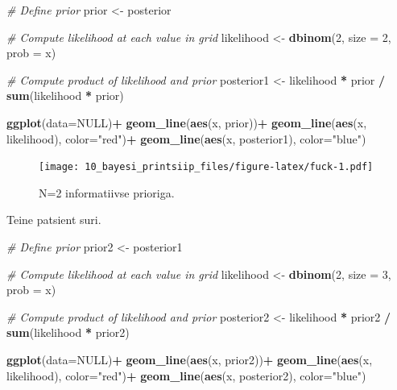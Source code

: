 \documentclass[]{book}
\newenvironment{Shaded}{\begin{snugshade}}{\end{snugshade}}
\newcommand{\CommentTok}[1]{\textcolor[rgb]{0.56,0.35,0.01}{\textit{#1}}}
\newcommand{\DataTypeTok}[1]{\textcolor[rgb]{0.13,0.29,0.53}{#1}}
\newcommand{\DecValTok}[1]{\textcolor[rgb]{0.00,0.00,0.81}{#1}}
\newcommand{\KeywordTok}[1]{\textcolor[rgb]{0.13,0.29,0.53}{\textbf{#1}}}
\newcommand{\NormalTok}[1]{#1}
\newcommand{\OperatorTok}[1]{\textcolor[rgb]{0.81,0.36,0.00}{\textbf{#1}}}
\newcommand{\OtherTok}[1]{\textcolor[rgb]{0.56,0.35,0.01}{#1}}
\newcommand{\StringTok}[1]{\textcolor[rgb]{0.31,0.60,0.02}{#1}}
\begin{document}
\begin{Shaded}
\begin{Highlighting}[]
\CommentTok{# Define prior}
\NormalTok{prior <-}\StringTok{ }\NormalTok{posterior}

\CommentTok{# Compute likelihood at each value in grid}
\NormalTok{likelihood <-}\StringTok{ }\KeywordTok{dbinom}\NormalTok{(}\DecValTok{2}\NormalTok{, }\DataTypeTok{size =} \DecValTok{2}\NormalTok{, }\DataTypeTok{prob =}\NormalTok{ x)}

\CommentTok{# Compute product of likelihood and prior}
\NormalTok{posterior1 <-}\StringTok{ }\NormalTok{likelihood }\OperatorTok{*}\StringTok{ }\NormalTok{prior }\OperatorTok{/}\StringTok{ }\KeywordTok{sum}\NormalTok{(likelihood }\OperatorTok{*}\StringTok{ }\NormalTok{prior)}

\KeywordTok{ggplot}\NormalTok{(}\DataTypeTok{data=}\OtherTok{NULL}\NormalTok{)}\OperatorTok{+}
\StringTok{  }\KeywordTok{geom_line}\NormalTok{(}\KeywordTok{aes}\NormalTok{(x, prior))}\OperatorTok{+}
\StringTok{  }\KeywordTok{geom_line}\NormalTok{(}\KeywordTok{aes}\NormalTok{(x, likelihood), }\DataTypeTok{color=}\StringTok{"red"}\NormalTok{)}\OperatorTok{+}
\StringTok{  }\KeywordTok{geom_line}\NormalTok{(}\KeywordTok{aes}\NormalTok{(x, posterior1), }\DataTypeTok{color=}\StringTok{"blue"}\NormalTok{)}
\end{Highlighting}
\end{Shaded}

\begin{figure}
\centering
\texttt{[image: 10\_bayesi\_printsiip\_files/figure-latex/fuck-1.pdf]}
\caption{\label{fig:fuck}N=2 informatiivse prioriga.}
\end{figure}

Teine patsient suri.



\begin{Shaded}
\begin{Highlighting}[]
\CommentTok{# Define prior}
\NormalTok{prior2 <-}\StringTok{ }\NormalTok{posterior1}

\CommentTok{# Compute likelihood at each value in grid}
\NormalTok{likelihood <-}\StringTok{ }\KeywordTok{dbinom}\NormalTok{(}\DecValTok{2}\NormalTok{, }\DataTypeTok{size =} \DecValTok{3}\NormalTok{, }\DataTypeTok{prob =}\NormalTok{ x)}

\CommentTok{# Compute product of likelihood and prior}
\NormalTok{posterior2 <-}\StringTok{ }\NormalTok{likelihood }\OperatorTok{*}\StringTok{ }\NormalTok{prior2 }\OperatorTok{/}\StringTok{ }\KeywordTok{sum}\NormalTok{(likelihood }\OperatorTok{*}\StringTok{ }\NormalTok{prior2)}

\KeywordTok{ggplot}\NormalTok{(}\DataTypeTok{data=}\OtherTok{NULL}\NormalTok{)}\OperatorTok{+}
\StringTok{  }\KeywordTok{geom_line}\NormalTok{(}\KeywordTok{aes}\NormalTok{(x, prior2))}\OperatorTok{+}
\StringTok{  }\KeywordTok{geom_line}\NormalTok{(}\KeywordTok{aes}\NormalTok{(x, likelihood), }\DataTypeTok{color=}\StringTok{"red"}\NormalTok{)}\OperatorTok{+}
\StringTok{  }\KeywordTok{geom_line}\NormalTok{(}\KeywordTok{aes}\NormalTok{(x, posterior2), }\DataTypeTok{color=}\StringTok{"blue"}\NormalTok{)}
\end{Highlighting}
\end{Shaded}
\end{document}

